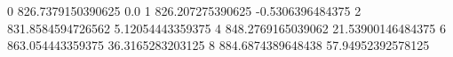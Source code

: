0 826.7379150390625 0.0
1 826.207275390625 -0.5306396484375
2 831.8584594726562 5.12054443359375
4 848.2769165039062 21.53900146484375
6 863.054443359375 36.3165283203125
8 884.6874389648438 57.94952392578125
